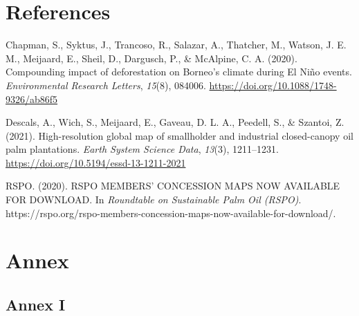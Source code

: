 \documentclass[
  letterpaper,
  DIV=11,
  numbers=noendperiod]{scrreprt}
\newlength{\cslhangindent}
\newlength{\cslentryspacingunit} %
\newenvironment{CSLReferences}[2] %
 {%
  \setlength{\parindent}{0pt}
  \ifodd #1
  \let\oldpar\par
  \def\par{\hangindent=\cslhangindent\oldpar}
  \fi
  \setlength{\parskip}{#2\cslentryspacingunit}
 }%
 {}
\begin{document}

\hypertarget{references}{%
\chapter{References}\label{references}}

\hypertarget{refs}{}
\begin{CSLReferences}{1}{0}
\leavevmode{}%
Chapman, S., Syktus, J., Trancoso, R., Salazar, A., Thatcher, M.,
Watson, J. E. M., Meijaard, E., Sheil, D., Dargusch, P., \& McAlpine, C.
A. (2020). Compounding impact of deforestation on {Borneo}'s climate
during {El Niño} events. \emph{Environmental Research Letters},
\emph{15}(8), 084006. \url{https://doi.org/10.1088/1748-9326/ab86f5}

\leavevmode{}%
Descals, A., Wich, S., Meijaard, E., Gaveau, D. L. A., Peedell, S., \&
Szantoi, Z. (2021). High-resolution global map of smallholder and
industrial closed-canopy oil palm plantations. \emph{Earth System
Science Data}, \emph{13}(3), 1211--1231.
\url{https://doi.org/10.5194/essd-13-1211-2021}

\leavevmode{}%
RSPO. (2020). {RSPO MEMBERS}' {CONCESSION MAPS NOW AVAILABLE FOR
DOWNLOAD}. In \emph{Roundtable on Sustainable Palm Oil (RSPO)}.
https://rspo.org/rspo-members-concession-maps-now-available-for-download/.

\end{CSLReferences}

\listoffigures

\listoftables


\hypertarget{annex}{%
\chapter*{Annex}\label{annex}}


\hypertarget{annex-1}{%
\section*{\texorpdfstring{Annex \textsc{I}}{Annex }}\label{annex-1}}

\end{document}
